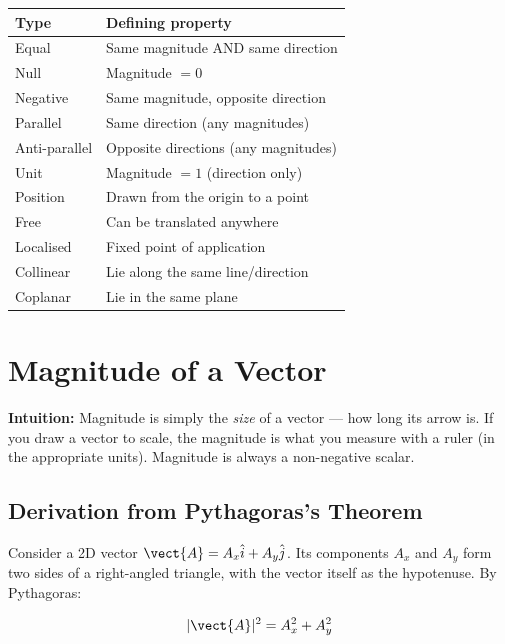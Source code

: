 \begin{keybox}
\centering
\begin{tabular}{ll}
\toprule
\textbf{Type} & \textbf{Defining property}\\
\midrule
Equal & Same magnitude AND same direction\\
Null  & Magnitude $= 0$\\
Negative & Same magnitude, opposite direction\\
Parallel & Same direction (any magnitudes)\\
Anti-parallel & Opposite directions (any magnitudes)\\
Unit & Magnitude $= 1$ (direction only)\\
Position & Drawn from the origin to a point\\
Free & Can be translated anywhere\\
Localised & Fixed point of application\\
Collinear & Lie along the same line/direction\\
Coplanar & Lie in the same plane\\
\bottomrule
\end{tabular}
\end{keybox}

\section{Magnitude of a Vector}
\label{sec:magnitude}

\textbf{Intuition:} Magnitude is simply the \textit{size}
of a vector --- how long its arrow is. If you draw a
vector to scale, the magnitude is what you measure with
a ruler (in the appropriate units). Magnitude is always
a non-negative scalar.

\subsection*{Derivation from Pythagoras's Theorem}

Consider a 2D vector $\vect{A} = A_x\hat{i} + A_y\hat{j}$.
Its components $A_x$ and $A_y$ form two sides of a
right-angled triangle, with the vector itself as the
hypotenuse. By Pythagoras:

\[
  |\vect{A}|^2 = A_x^2 + A_y^2
\]

